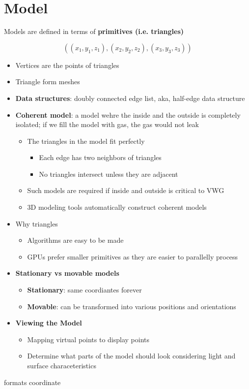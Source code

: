 \chapter{Model}

Models are defined in terms of \textbf{primitives (i.e. triangles)}

\begin{equation}
  \left(
    \left( x_{1}, y_{1}, z_{1} \right),
    \left( x_{2}, y_{2}, z_{2} \right),
    \left( x_{3}, y_{3}, z_{3} \right)
  \right)
\end{equation}

\begin{itemize}
  \item Vertices are the points of triangles
  \item Triangle form meshes
  \item \textbf{Data structures}: doubly connected edge list, aka, half-edge
  data structure

  \item \textbf{Coherent model}: a model wehre the inside and the outside is
  completely isolated; if we fill the model with gas, the gas would not leak
  \begin{itemize}
    \item The triangles in the model fit perfectly
    \begin{itemize}
      \item Each edge has two neighbors of triangles
      \item No triangles intersect unless they are adjacent
    \end{itemize}

    \item Such models are required if inside and outside is critical to VWG
    \item 3D modeling tools automatically construct coherent models
  \end{itemize}

  \item Why triangles
  \begin{itemize}
    \item Algorithms are easy to be made
    \item GPUs prefer smaller primitives as they are easier to parallelly
    process
  \end{itemize}

  \item \textbf{Stationary vs movable models}
  \begin{itemize}
    \item \textbf{Stationary}: same coordiantes forever
    \item \textbf{Movable}: can be transformed into various positions and
    orientations
  \end{itemize}

  \item \textbf{Viewing the Model}
  \begin{itemize}
    \item Mapping virtual points to display points
    \item Determine what parts of the model should look considering light and
    surface characeteristics
  \end{itemize}
\end{itemize}

{formats}
{coordinate}
